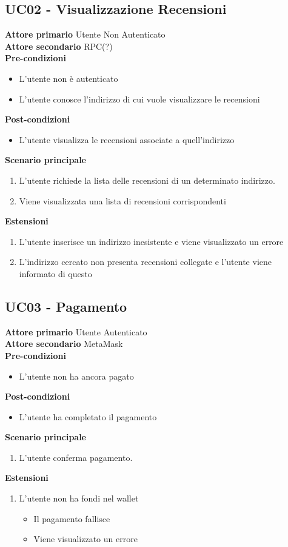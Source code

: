 \subsection{UC02 - Visualizzazione Recensioni}
\textbf{Attore primario} Utente Non Autenticato \\
\textbf{Attore secondario} RPC(?) \\
\textbf{Pre-condizioni}
\begin{itemize}
    \item L'utente non è autenticato
    \item L'utente conosce l'indirizzo di cui vuole visualizzare le recensioni
\end{itemize}
\textbf{Post-condizioni}
\begin{itemize}
    \item L'utente visualizza le recensioni associate a quell'indirizzo
\end{itemize}
\textbf{Scenario principale}
\begin{enumerate}
    \item L'utente richiede la lista delle recensioni di un determinato indirizzo.
    \item Viene visualizzata una lista di recensioni corrispondenti
\end{enumerate}
\textbf{Estensioni}
\begin{enumerate}
    \item L'utente inserisce un indirizzo inesistente e viene visualizzato un errore
    \item L'indirizzo cercato non presenta recensioni collegate e l'utente viene
          informato di questo
\end{enumerate}

\subsection{UC03 - Pagamento}
\textbf{Attore primario} Utente Autenticato \\
\textbf{Attore secondario} MetaMask \\
\textbf{Pre-condizioni}
\begin{itemize}
    \item L'utente non ha ancora pagato
\end{itemize}
\textbf{Post-condizioni}
\begin{itemize}
    \item L'utente ha completato il pagamento
\end{itemize}
\textbf{Scenario principale}
\begin{enumerate}
    \item L'utente conferma pagamento.
\end{enumerate}
\textbf{Estensioni}
\begin{enumerate}
    \item L'utente non ha fondi nel wallet
          \begin{itemize}
              \item Il pagamento fallisce
              \item Viene visualizzato un errore
          \end{itemize}
\end{enumerate}

